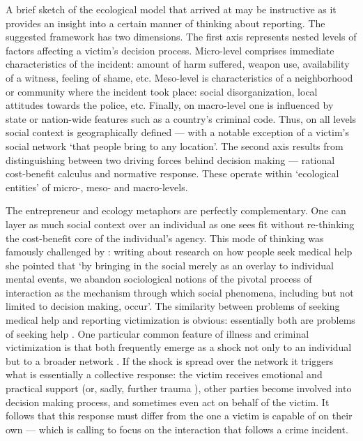 \documentclass[]{interact}
\theoremstyle{plain}%
\theoremstyle{definition}
\theoremstyle{remark}
\newcommand\citep{\parencite}
\newcommand\citet{\textcite}
\begin{document}
	A brief sketch of the ecological model that \citet{goudriaan2004reporting} arrived at may be instructive as it provides an insight into a certain manner of thinking about reporting. The suggested framework has two dimensions. The first axis represents nested levels of factors affecting a victim's decision process. Micro-level comprises immediate characteristics of the incident: amount of harm suffered, weapon use, availability of a witness, feeling of shame, etc. Meso-level is characteristics of a neighborhood or community where the incident took place: social disorganization, local attitudes towards the police, etc. Finally, on macro-level one is influenced by state or nation-wide features such as a country's criminal code. Thus, on all levels social context is geographically defined --- with a notable exception of a victim's social network `that people bring to any location'. The second axis results from distinguishing between two driving forces behind decision making --- rational cost-benefit calculus and normative response. These operate within `ecological entities' of micro-, meso- and macro-levels.
	
	The entrepreneur and ecology metaphors are perfectly complementary. One can layer as much social context over an individual as one sees fit without re-thinking the cost-benefit core of the individual's agency. This mode of thinking was famously challenged by \citet{pescosolido1992beyond}: writing about research on how people seek medical help she pointed that `by bringing in the social merely as an overlay to individual mental events, we abandon sociological notions of the pivotal process of interaction as the mechanism through which social phenomena, including but not limited to decision making, occur'. The similarity between problems of seeking medical help and reporting victimization is obvious: essentially both are problems of seeking help \citep{xie2019crime}. One particular common feature of illness and criminal victimization is that both frequently emerge as a shock not only to an individual but to a broader network \citep{ruback1984social, friedman1982victims}. If the shock is spread over the network it triggers what is essentially a collective response: the victim receives emotional and practical support (or, sadly, further trauma \citep{davis1996supportive}), other parties become involved into decision making process, and sometimes even act on behalf of the victim. It follows that this response must differ from the one a victim is capable of on their own --- which is calling to focus on the interaction that follows a crime incident.
	
\end{document}
